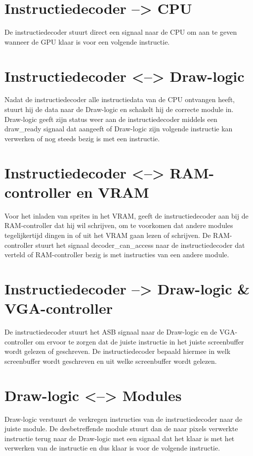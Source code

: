 \documentclass{scrartcl} %
\begin{document}
\section{Instructiedecoder --> CPU}
De instructiedecoder stuurt direct een signaal naar de CPU om aan te geven wanneer de GPU klaar is voor een volgende instructie.

\section{Instructiedecoder <--> Draw-logic}
Nadat de instructiedecoder alle instructiedata van de CPU ontvangen heeft, stuurt hij de data naar de Draw-logic en schakelt hij de correcte module in. Draw-logic geeft zijn status weer aan de instructiedecoder middels een draw\_ready signaal dat aangeeft of Draw-logic zijn volgende instructie kan verwerken of nog steeds bezig is met een instructie.

\section {Instructiedecoder <--> RAM-controller en VRAM}
Voor het inladen van sprites in het VRAM, geeft de instructiedecoder aan bij de RAM-controller dat hij wil schrijven, om te voorkomen dat andere modules tegelijkertijd dingen in of uit het VRAM gaan lezen of schrijven. De RAM-controller stuurt het signaal decoder\_can\_access naar de instructiedecoder dat verteld of RAM-controller bezig is met instructies van een andere module.

\section {Instructiedecoder --> Draw-logic \& VGA-controller}
De instructiedecoder stuurt het ASB signaal naar de Draw-logic en de VGA-controller om ervoor te zorgen dat de juiste instructie in het juiste screenbuffer wordt gelezen of geschreven. De instructiedecoder bepaald hiermee in welk screenbuffer wordt geschreven en uit welke screenbuffer wordt gelezen.

\section {Draw-logic <--> Modules}
Draw-logic verstuurt de verkregen instructies van de instructiedecoder naar de juiste module. De desbetreffende module stuurt dan de naar pixels verwerkte instructie terug naar de Draw-logic met een signaal dat het klaar is met het verwerken van de instructie en dus klaar is voor de volgende instructie.
\end{document}
